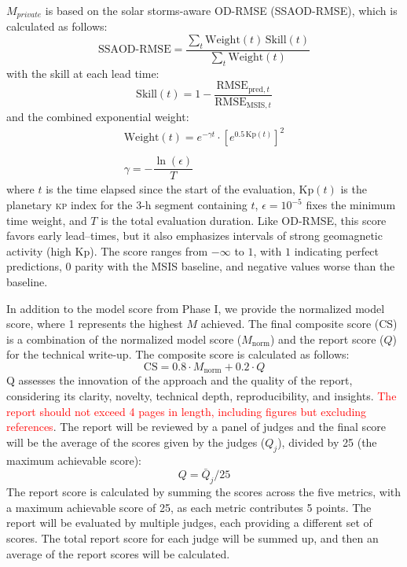 \documentclass[11pt,a4paper]{storm-ai_report}
\begin{document}
$M_{private}$ is based on the solar storms-aware OD-RMSE (SSAOD-RMSE), which is calculated as follows: 
\begin{equation}
  \text{SSAOD-RMSE}=
  \frac{\displaystyle\sum_t \text{Weight}(t)\,\text{Skill}(t)}
       {\displaystyle\sum_t \text{Weight}(t)}
\end{equation}
with the skill at each lead time:
\begin{equation}
\text{Skill}(t)=1-\frac{\text{RMSE}_{\text{pred},t}}
                      {\text{RMSE}_{\text{MSIS},t}}
\end{equation}
and the combined exponential weight:
\begin{equation}
\begin{array}{l}
\text{Weight}(t) =
e^{-\gamma t} \cdot \left[e^{0.5\,\mathrm{Kp}(t)}\right]^2 \\
\\
\gamma = -\dfrac{\ln(\epsilon)}{T}
\end{array}
\end{equation}
where $t$ is the time elapsed since the start of the evaluation, $\mathrm{Kp}(t)$ is the planetary \textsc{kp} index for the 3-h segment containing $t$, $\epsilon=10^{-5}$ fixes the minimum time weight, and $T$ is the total evaluation duration. Like OD-RMSE, this score favors early lead–times, but it also emphasizes intervals of strong geomagnetic activity (high Kp). The score ranges from $-\infty$ to $1$, with $1$ indicating perfect predictions, $0$ parity with the MSIS baseline, and negative values worse than the baseline.

In addition to the model score from Phase I, we provide the normalized model score, where 1 represents the highest $M$ achieved. The final composite score (CS) is a combination of the normalized model score ($M_{\text{norm}}$) and the report score ($Q$) for the technical write-up. The composite score is calculated as follows:
\begin{equation}
    \text{CS} = 0.8 \cdot M_{\text{norm}} + 0.2 \cdot Q
\end{equation}
Q assesses the innovation of the approach and the quality of the report, considering its clarity, novelty, technical depth, reproducibility, and insights. \textcolor{red}{The report should not exceed 4 pages in length, including figures but excluding references}. The report will be reviewed by a panel of judges and the final score will be the average of the scores given by the judges ($Q_{j}$), divided by 25 (the maximum achievable score): 
\begin{equation}
    Q = \bar Q_{j}/25
\end{equation}
The report score is calculated by summing the scores across the five metrics, with a maximum achievable score of 25, as each metric contributes 5 points. The report will be evaluated by multiple judges, each providing a different set of scores. The total report score for each judge will be summed up, and then an average of the report scores will be calculated. 
\end{document}
